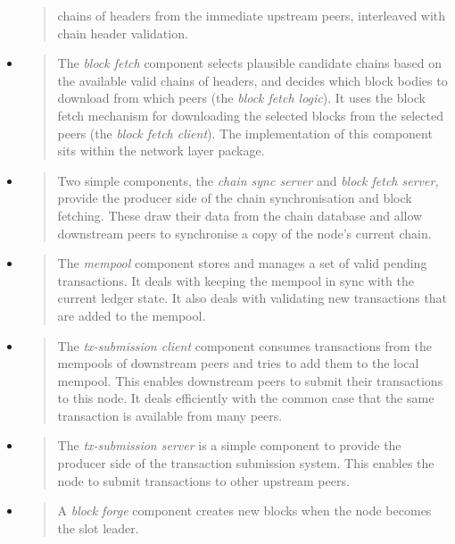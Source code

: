\documentclass[11pt,a4paper]{article}
\begin{document}
\begin{itemize}
\begin{quote}
  chains of headers from the immediate upstream peers, interleaved with
  chain header validation.
  \end{quote}
\item
  \begin{quote}
  The \emph{block fetch} component selects plausible candidate chains
  based on the available valid chains of headers, and decides which
  block bodies to download from which peers (the \emph{block fetch
  logic}). It uses the block fetch mechanism for downloading the
  selected blocks from the selected peers (the \emph{block fetch
  client}). The implementation of this component sits within the network
  layer package.
  \end{quote}
\item
  \begin{quote}
  Two simple components, the \emph{chain sync server} and \emph{block
  fetch server,} provide the producer side of the chain synchronisation
  and block fetching. These draw their data from the chain database and
  allow downstream peers to synchronise a copy of the node's current
  chain.
  \end{quote}
\item
  \begin{quote}
  The \emph{mempool} component stores and manages a set of valid pending
  transactions. It deals with keeping the mempool in sync with the
  current ledger state. It also deals with validating new transactions
  that are added to the mempool.
  \end{quote}
\item
  \begin{quote}
  The \emph{tx-submission client} component consumes transactions from
  the mempools of downstream peers and tries to add them to the local
  mempool. This enables downstream peers to submit their transactions to
  this node. It deals efficiently with the common case that the same
  transaction is available from many peers.
  \end{quote}
\item
  \begin{quote}
  The \emph{tx-submission server} is a simple component to provide the
  producer side of the transaction submission system. This enables the
  node to submit transactions to other upstream peers.
  \end{quote}
\item
  \begin{quote}
  A \emph{block forge} component creates new blocks when the node
  becomes the slot leader.
  \end{quote}
\end{itemize}
\end{document}
